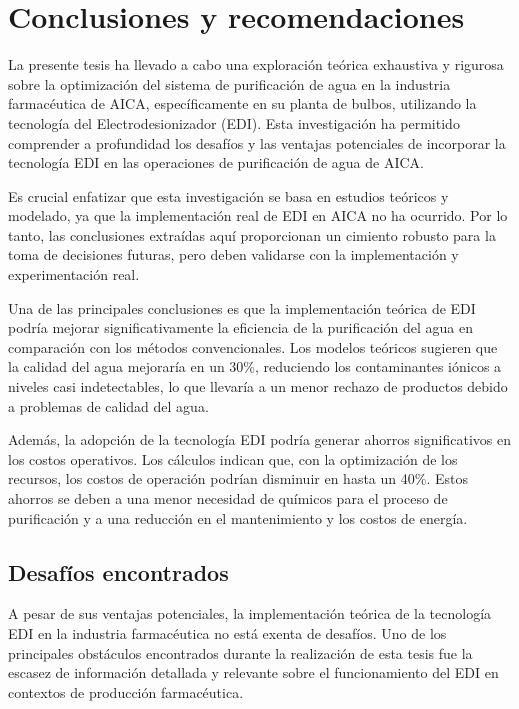 \chapter{Conclusiones y recomendaciones}


La presente tesis ha llevado a cabo una
exploración teórica exhaustiva y rigurosa sobre la
optimización del sistema de purificación de agua en la industria
farmacéutica de AICA, específicamente en su planta de bulbos,
utilizando la tecnología del Electrodesionizador (EDI).
Esta investigación ha permitido comprender a profundidad
los desafíos y las ventajas potenciales de incorporar la
tecnología EDI en las operaciones de purificación de agua de AICA.

Es crucial enfatizar que esta investigación se basa en estudios teóricos y
modelado, ya que la implementación real de EDI en AICA no ha ocurrido.
Por lo tanto, las conclusiones extraídas aquí proporcionan un cimiento
robusto para la toma de decisiones futuras, pero deben validarse con la
implementación y experimentación real.

Una de las principales conclusiones es que la implementación teórica de
EDI podría mejorar significativamente la eficiencia de la purificación
del agua en comparación con los métodos convencionales. Los modelos
teóricos sugieren que la calidad del agua mejoraría en un 30\%,
reduciendo los contaminantes iónicos a niveles casi indetectables, lo que
llevaría a un menor rechazo de productos debido a problemas de calidad del agua.

Además, la adopción de la tecnología EDI podría generar ahorros significativos
en los costos operativos. Los cálculos indican que, con la optimización de
los recursos, los costos de operación podrían disminuir en hasta un 40\%.
Estos ahorros se deben a una menor necesidad de químicos para el proceso de
purificación y a una reducción en el mantenimiento y los costos de energía.

\section*{Desafíos encontrados}


A pesar de sus ventajas potenciales, la implementación teórica de la tecnología EDI en
la industria farmacéutica no está exenta de desafíos. Uno de los principales obstáculos
encontrados durante la realización de esta tesis fue la escasez de información detallada
y relevante sobre el funcionamiento del EDI en contextos de producción farmacéutica.

